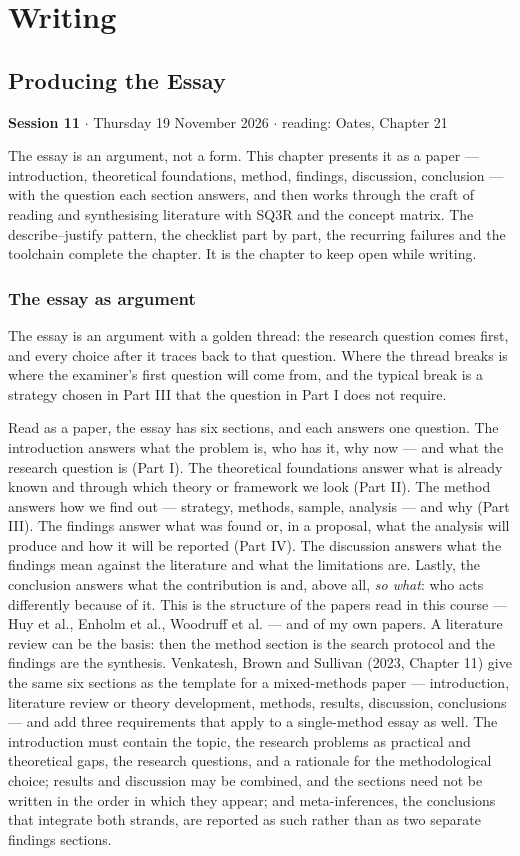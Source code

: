 \documentclass[11pt,a4paper,british,twoside=false,headings=small,chapterprefix=false,numbers=noenddot]{scrbook}
\newcommand{\sessionhead}[2]{\begin{tcolorbox}[enhanced, colback=uiamutedblue, colframe=uiamutedblue, arc=1.5pt, left=6pt, right=6pt]
  \small \textbf{Session #1} \;$\cdot$\; #2\end{tcolorbox}}
\begin{document}
\part{Writing}
\chapter{Producing the Essay}
\label{ch:11}
\sessionhead{11}{Thursday 19 November 2026 \;$\cdot$\; reading: Oates, Chapter 21}

The essay is an argument, not a form. This chapter presents it as a paper --- introduction, theoretical foundations, method, findings, discussion, conclusion --- with the question each section answers, and then works through the craft of reading and synthesising literature with SQ3R and the concept matrix. The describe--justify pattern, the checklist part by part, the recurring failures and the toolchain complete the chapter. It is the chapter to keep open while writing.


\section{The essay as argument}

The essay is an argument with a golden thread: the research question comes first, and every choice after it traces back to that question. Where the thread breaks is where the examiner's first question will come from, and the typical break is a strategy chosen in Part III that the question in Part I does not require.

Read as a paper, the essay has six sections, and each answers one question. The introduction answers what the problem is, who has it, why now --- and what the research question is (Part I). The theoretical foundations answer what is already known and through which theory or framework we look (Part II). The method answers how we find out --- strategy, methods, sample, analysis --- and why (Part III). The findings answer what was found or, in a proposal, what the analysis will produce and how it will be reported (Part IV). The discussion answers what the findings mean against the literature and what the limitations are. Lastly, the conclusion answers what the contribution is and, above all, \emph{so what}: who acts differently because of it. This is the structure of the papers read in this course --- Huy et al., Enholm et al., Woodruff et al. --- and of my own papers. A literature review can be the basis: then the method section is the search protocol and the findings are the synthesis. Venkatesh, Brown and Sullivan (2023, Chapter 11) give the same six sections as the template for a mixed-methods paper --- introduction, literature review or theory development, methods, results, discussion, conclusions --- and add three requirements that apply to a single-method essay as well. The introduction must contain the topic, the research problems as practical and theoretical gaps, the research questions, and a rationale for the methodological choice; results and discussion may be combined, and the sections need not be written in the order in which they appear; and meta-inferences, the conclusions that integrate both strands, are reported as such rather than as two separate findings sections.
\end{document}

